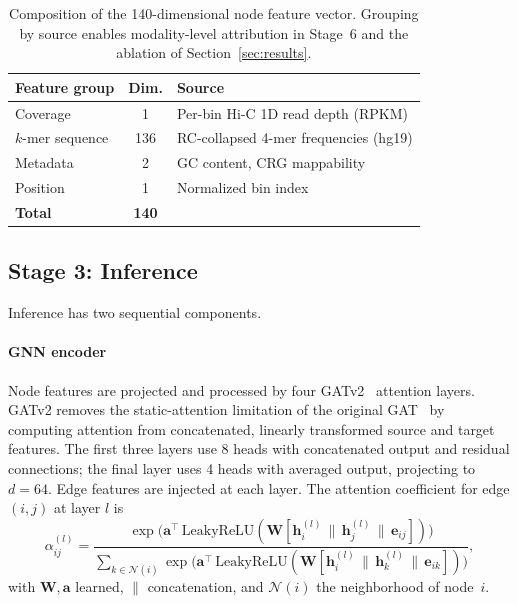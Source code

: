 \documentclass[conference]{IEEEtran}
\begin{document}
\begin{table}[t]
\caption{Composition of the 140-dimensional node feature vector. Grouping by
source enables modality-level attribution in Stage~6 and the ablation of
Section~\ref{sec:results}.}
\label{tab:features}
\centering
\renewcommand{\arraystretch}{1.2}
\begin{tabular}{@{}lcl@{}}
\toprule
\textbf{Feature group} & \textbf{Dim.} & \textbf{Source} \\
\midrule
Coverage & 1 & Per-bin Hi-C 1D read depth (RPKM) \\
$k$-mer sequence & 136 & RC-collapsed 4-mer frequencies (hg19) \\
Metadata & 2 & GC content, CRG mappability \\
Position & 1 & Normalized bin index \\
\midrule
\textbf{Total} & \textbf{140} & \\
\bottomrule
\end{tabular}
\end{table}

\subsection{Stage 3: Inference}
Inference has two sequential components.

\paragraph{GNN encoder}
Node features are projected and processed by four GATv2~\cite{gatv2} attention
layers. GATv2 removes the static-attention limitation of the original
GAT~\cite{gat2018} by computing attention from concatenated, linearly transformed
source and target features. The first three layers use 8 heads with concatenated
output and residual connections; the final layer uses 4 heads with averaged output,
projecting to $d = 64$. Edge features are injected at each layer. The attention
coefficient for edge $(i,j)$ at layer $l$ is
\begin{equation}
\alpha_{ij}^{(l)} =
\frac{\exp\!\big(\mathbf{a}^{\top}\,\mathrm{LeakyReLU}(\mathbf{W}[\mathbf{h}_i^{(l)} \,\|\, \mathbf{h}_j^{(l)} \,\|\, \mathbf{e}_{ij}])\big)}
{\displaystyle\sum_{k \in \mathcal{N}(i)} \exp\!\big(\mathbf{a}^{\top}\,\mathrm{LeakyReLU}(\mathbf{W}[\mathbf{h}_i^{(l)} \,\|\, \mathbf{h}_k^{(l)} \,\|\, \mathbf{e}_{ik}])\big)},
\end{equation}
with $\mathbf{W},\mathbf{a}$ learned, $\|$ concatenation, and $\mathcal{N}(i)$ the
neighborhood of node~$i$.
\end{document}
